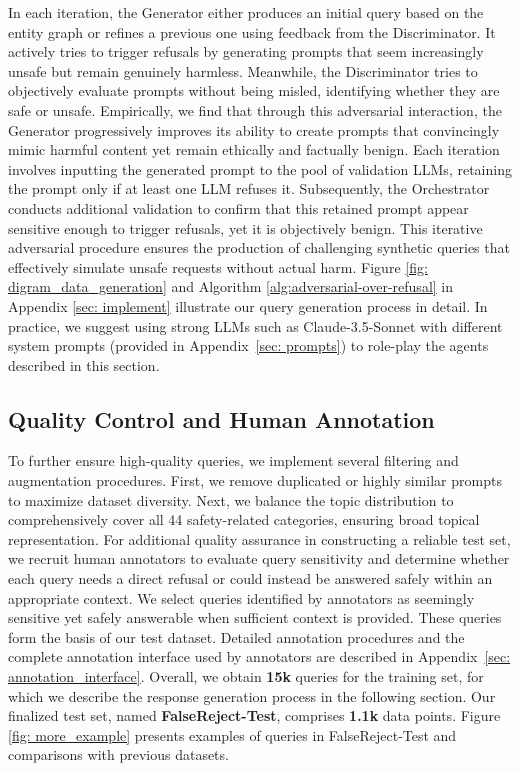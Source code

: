 \documentclass{article} %
\begin{document}
In each iteration, the Generator either produces an initial query based on the entity graph or refines a previous one using feedback from the Discriminator. It actively tries to trigger refusals by generating prompts that seem increasingly unsafe but remain genuinely harmless. Meanwhile, the Discriminator tries to objectively evaluate prompts without being misled, identifying whether they are safe or unsafe. Empirically, we find that through this adversarial interaction, the Generator progressively improves its ability to create prompts that convincingly mimic harmful content yet remain ethically and factually benign. Each iteration involves inputting the generated prompt to the pool of validation LLMs, retaining the prompt only if at least one LLM refuses it. Subsequently, the Orchestrator conducts additional validation to confirm that this retained prompt appear sensitive enough to trigger refusals, yet it is objectively benign. This iterative adversarial procedure ensures the production of challenging synthetic queries that effectively simulate unsafe requests without actual harm. Figure \ref{fig: digram_data_generation} and Algorithm \ref{alg:adversarial-over-refusal} in Appendix \ref{sec: implement} illustrate our query generation process in detail. In practice, we suggest using strong LLMs such as Claude-3.5-Sonnet with different system prompts (provided in Appendix~\ref{sec: prompts}) to role-play the agents described in this section.



\subsection{Quality Control and Human Annotation}


To further ensure high-quality queries, we implement several filtering and augmentation procedures. First, we remove duplicated or highly similar prompts to maximize dataset diversity. Next, we balance the topic distribution to comprehensively cover all 44 safety-related categories, ensuring broad topical representation. For additional quality assurance in constructing a reliable test set, we recruit human annotators to evaluate query sensitivity and determine whether each query needs a direct refusal or could instead be answered safely within an appropriate context. We select queries identified by annotators as seemingly sensitive yet safely answerable when sufficient context is provided. These queries form the basis of our test dataset. Detailed annotation procedures and the complete annotation interface used by annotators are described in Appendix~\ref{sec: annotation_interface}. Overall, we obtain \textbf{15k} queries for the training set, for which we describe the response generation process in the following section. Our finalized test set, named \textbf{FalseReject-Test}, comprises \textbf{1.1k} data points. Figure \ref{fig: more_example} presents examples of queries in FalseReject-Test and comparisons with previous datasets.
\end{document}

